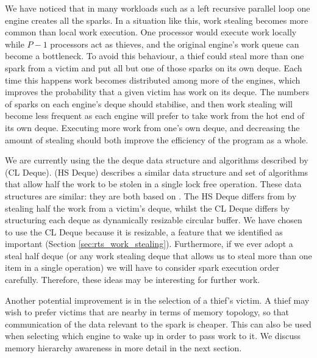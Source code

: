 We have noticed that in many workloads such as a left recursive parallel
loop one engine creates all the sparks.
In a situation like this,
work stealing becomes more common than local work execution.
One processor would execute work locally while $P - 1$ processors act as
thieves,
and the original engine's work queue can become a bottleneck.
To avoid this behaviour,
a thief could steal more than one spark from a victim and put all but one of
those sparks on its own deque.
Each time this happens work becomes distributed among more of the engines,
which improves the probability that a given victim has work on its deque.
The numbers of sparks on each engine's deque should stabilise,
and then work stealing will become less frequent as each engine will prefer to
take work from the hot end of its own deque.
Executing more work from one's own deque, and decreasing the amount of stealing
should both improve the efficiency of the program as a whole.

We are currently using the the deque data structure and algorithms described by
\citet{Chase_2005_wsdeque} (CL Deque).
\citet{hendler:2002:stealhalf} (HS Deque) describes a similar data structure
and set of algorithms that allow half the work to be stolen in a single lock
free operation.
These data structures are similar:
they are both based on \citet{arora:1998:work-stealing}.
The HS Deque differs from 
\citet{arora:1998:work-stealing}
by stealing half the work from a victim's deque,
whilst the CL Deque differs by structuring each deque as
dynamically resizable circular buffer.
We have chosen to use the CL Deque because it is resizable,
a feature that we identified as important (Section \ref{sec:rts_work_stealing}).
Furthermore,
if we ever adopt a steal half deque (or any work stealing deque that allows
us to steal more than one item in a single operation) we will have to
consider spark execution order carefully.
Therefore,
these ideas may be interesting for further work.

Another potential improvement is in the selection of a thief's victim.
A thief may wish to prefer victims that are nearby in terms of memory
topology, so that communication of the data relevant to the spark is
cheaper.
This can also be used when selecting which engine to wake up in order to
pass work to it.
We discuss memory hierarchy awareness in more detail in the next section.

